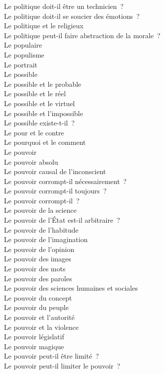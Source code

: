 \documentclass[a4paper,12pt]{article}
\begin{document}
Le politique doit-il être un technicien ? \\
Le politique doit-il se soucier des émotions ? \\
Le politique et le religieux \\
Le politique peut-il faire abstraction de la morale ? \\
Le populaire \\
Le populisme \\
Le portrait \\
Le possible \\
Le possible et le probable \\
Le possible et le réel \\
Le possible et le virtuel \\
Le possible et l'impossible \\
Le possible existe-t-il ? \\
Le pour et le contre \\
Le pourquoi et le comment \\
Le pouvoir \\
Le pouvoir absolu \\
Le pouvoir causal de l'inconscient \\
Le pouvoir corrompt-il nécessairement ? \\
Le pouvoir corrompt-il toujours ? \\
Le pouvoir corrompt-il ? \\
Le pouvoir de la science \\
Le pouvoir de l'État est-il arbitraire ? \\
Le pouvoir de l'habitude \\
Le pouvoir de l'imagination \\
Le pouvoir de l'opinion \\
Le pouvoir des images \\
Le pouvoir des mots \\
Le pouvoir des paroles \\
Le pouvoir des sciences humaines et sociales \\
Le pouvoir du concept \\
Le pouvoir du peuple \\
Le pouvoir et l'autorité \\
Le pouvoir et la violence \\
Le pouvoir législatif \\
Le pouvoir magique \\
Le pouvoir peut-il être limité ? \\
Le pouvoir peut-il limiter le pouvoir ? \\
\end{document}
